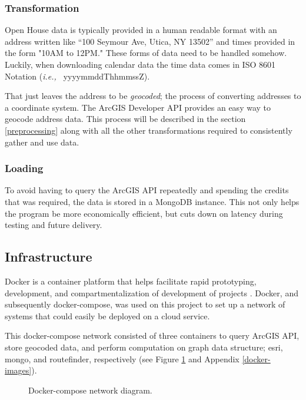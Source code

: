 \documentclass[letterpaper,11pt]{report}
\theoremstyle{definition}
\theoremstyle{definition}
\def\ie{{i.e.,}\ }
\begin{document}
\subsubsection{Transformation}\label{T}
Open House data is typically provided in a human readable format with an address written like ``100 Seymour Ave, Utica, NY 13502'' and times provided in the form "10AM to 12PM." These forms of data need to be handled somehow. Luckily, when downloading calendar data the time data comes in ISO 8601 Notation (\emph{\ie} yyyymmddThhmmssZ).

That just leaves the address to be \emph{geocoded}; the process of converting addresses to a coordinate system. The ArcGIS Developer API provides an easy way to geocode address data. This process will be described in the section \ref{preprocessing} along with all the other transformations required to consistently gather and use data.
 
\subsubsection{Loading}\label{L}
To avoid having to query the ArcGIS API repeatedly and spending the credits that was required\cite{ArcGIS}, the data is stored in a MongoDB instance. This not only helps the program be more economically efficient, but cuts down on latency during testing and future delivery.

\subsection{Infrastructure}
Docker is a container platform that helps facilitate rapid prototyping, development, and compartmentalization of development of projects \cite{DOCKER}. Docker, and subsequently docker-compose\cite{DC}, was used on this project to set up a network of systems that could easily be deployed on a cloud service. 

This docker-compose network consisted of three containers to query ArcGIS API, store geocoded data, and perform computation on graph data structure; esri, mongo, and routefinder, respectively (see Figure \ref{docker-compose-network-diagram} and Appendix \ref{docker-images}).
\begin{figure}[!htb]
  \begin{center}
      
      \caption{Docker-compose network diagram.}\label{docker-compose-network-diagram}
    \end{center}
\end{figure}
\end{document}
